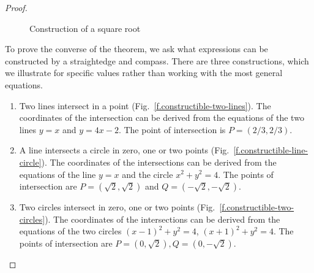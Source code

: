\begin{proof}
\begin{figure}[b]
\begin{center}
\end{center}
\caption{Construction of a square root}
\label{f.trisect-square-root}
\end{figure}

To prove the converse of the theorem, we ask what expressions can be constructed by a straightedge and compass. There are three constructions, which we illustrate for specific values rather than working with the most general equations.

\begin{enumerate}
\item Two lines intersect in a point (Fig.~\ref{f.constructible-two-lines}). The coordinates of the intersection can be derived from the equations of the two lines
$y=x$ and $y=4x-2$. The point of intersection is $P= (2/3, 2/3)$.

\item A line intersects a circle in zero, one or two points (Fig.~\ref{f.constructible-line-circle}). The coordinates of the intersections can be derived from the equations of the line $y=x$ and the circle $x^2+y^2=4$. The points of intersection are
$P=(\sqrt{2}, \sqrt{2})$ and $Q=(-\sqrt{2}, -\sqrt{2})$.

\item Two circles intersect in zero, one or two points (Fig.~\ref{f.constructible-two-circles}). The coordinates of the intersections can be derived from the equations of the two circles $(x-1)^2+y^2=4$, $(x+1)^2+y^2=4$. The points of intersection are $P=(0,\sqrt{2}),Q=(0,-\sqrt{2})$.
\end{enumerate}
\end{proof}

